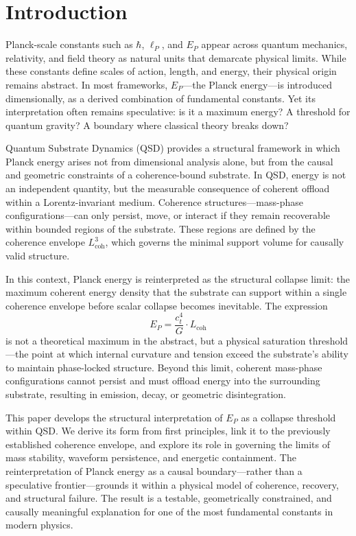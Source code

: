 \documentclass[entropy,article,submit,pdftex,moreauthors]{Definitions/mdpi}
\begin{document}

\section{Introduction}

Planck-scale constants such as \( \hbar \), \( \ell_P \), and \( E_P \) appear across quantum mechanics, relativity, and field theory as natural units that demarcate physical limits. While these constants define scales of action, length, and energy, their physical origin remains abstract. In most frameworks, \( E_P \)---the Planck energy---is introduced dimensionally, as a derived combination of fundamental constants. Yet its interpretation often remains speculative: is it a maximum energy? A threshold for quantum gravity? A boundary where classical theory breaks down?

Quantum Substrate Dynamics (QSD) \cite{bush2025} provides a structural framework in which Planck energy arises not from dimensional analysis alone, but from the causal and geometric constraints of a coherence-bound substrate. In QSD, energy is not an independent quantity, but the measurable consequence of coherent offload within a Lorentz-invariant medium. Coherence structures---mass-phase configurations---can only persist, move, or interact if they remain recoverable within bounded regions of the substrate. These regions are defined by the coherence envelope \( L_{\text{coh}}^3 \), which governs the minimal support volume for causally valid structure.

In this context, Planck energy is reinterpreted as the structural collapse limit: the maximum coherent energy density that the substrate can support within a single coherence envelope before scalar collapse becomes inevitable. The expression
\[
E_P = \frac{c_t^4}{G} \cdot L_{\text{coh}}
\]
is not a theoretical maximum in the abstract, but a physical saturation threshold---the point at which internal curvature and tension exceed the substrate’s ability to maintain phase-locked structure. Beyond this limit, coherent mass-phase configurations cannot persist and must offload energy into the surrounding substrate, resulting in emission, decay, or geometric disintegration.

This paper develops the structural interpretation of \( E_P \) as a collapse threshold within QSD. We derive its form from first principles, link it to the previously established coherence envelope, and explore its role in governing the limits of mass stability, waveform persistence, and energetic containment. The reinterpretation of Planck energy as a causal boundary---rather than a speculative frontier---grounds it within a physical model of coherence, recovery, and structural failure. The result is a testable, geometrically constrained, and causally meaningful explanation for one of the most fundamental constants in modern physics.
\end{document}
